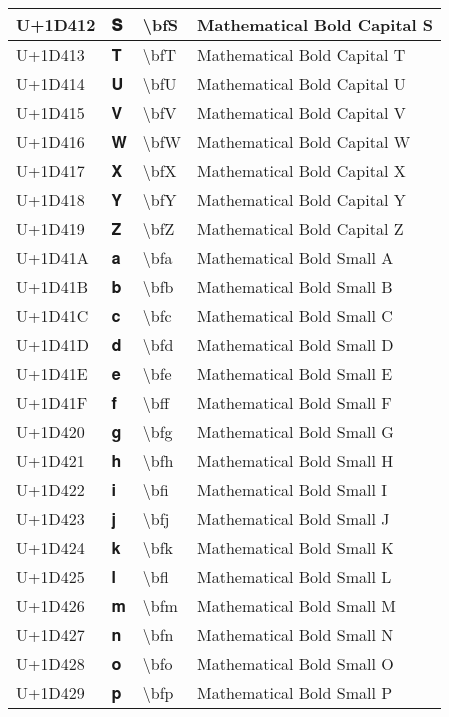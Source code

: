 \begin{table}[h]
\begin{tabulary}{\linewidth}{|L|L|L|L|}
\hline
U+1D412 & 𝐒 & {\textbackslash}bfS & Mathematical Bold Capital S \\
\hline
U+1D413 & 𝐓 & {\textbackslash}bfT & Mathematical Bold Capital T \\
\hline
U+1D414 & 𝐔 & {\textbackslash}bfU & Mathematical Bold Capital U \\
\hline
U+1D415 & 𝐕 & {\textbackslash}bfV & Mathematical Bold Capital V \\
\hline
U+1D416 & 𝐖 & {\textbackslash}bfW & Mathematical Bold Capital W \\
\hline
U+1D417 & 𝐗 & {\textbackslash}bfX & Mathematical Bold Capital X \\
\hline
U+1D418 & 𝐘 & {\textbackslash}bfY & Mathematical Bold Capital Y \\
\hline
U+1D419 & 𝐙 & {\textbackslash}bfZ & Mathematical Bold Capital Z \\
\hline
U+1D41A & 𝐚 & {\textbackslash}bfa & Mathematical Bold Small A \\
\hline
U+1D41B & 𝐛 & {\textbackslash}bfb & Mathematical Bold Small B \\
\hline
U+1D41C & 𝐜 & {\textbackslash}bfc & Mathematical Bold Small C \\
\hline
U+1D41D & 𝐝 & {\textbackslash}bfd & Mathematical Bold Small D \\
\hline
U+1D41E & 𝐞 & {\textbackslash}bfe & Mathematical Bold Small E \\
\hline
U+1D41F & 𝐟 & {\textbackslash}bff & Mathematical Bold Small F \\
\hline
U+1D420 & 𝐠 & {\textbackslash}bfg & Mathematical Bold Small G \\
\hline
U+1D421 & 𝐡 & {\textbackslash}bfh & Mathematical Bold Small H \\
\hline
U+1D422 & 𝐢 & {\textbackslash}bfi & Mathematical Bold Small I \\
\hline
U+1D423 & 𝐣 & {\textbackslash}bfj & Mathematical Bold Small J \\
\hline
U+1D424 & 𝐤 & {\textbackslash}bfk & Mathematical Bold Small K \\
\hline
U+1D425 & 𝐥 & {\textbackslash}bfl & Mathematical Bold Small L \\
\hline
U+1D426 & 𝐦 & {\textbackslash}bfm & Mathematical Bold Small M \\
\hline
U+1D427 & 𝐧 & {\textbackslash}bfn & Mathematical Bold Small N \\
\hline
U+1D428 & 𝐨 & {\textbackslash}bfo & Mathematical Bold Small O \\
\hline
U+1D429 & 𝐩 & {\textbackslash}bfp & Mathematical Bold Small P \\

\end{tabulary}
\end{table}
